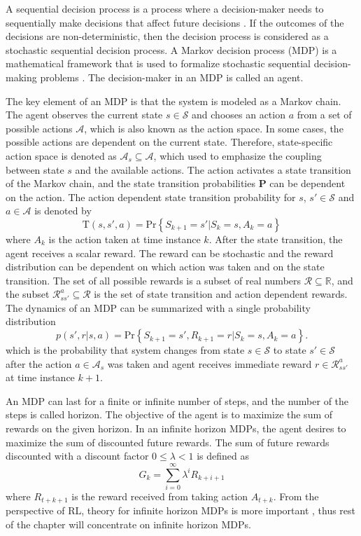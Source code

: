 \documentclass[english, 12pt, a4paper, elec, utf8, a-1b, online]{aaltothesis}
\renewcommand{\vec}[1]{\mathbf{#1}}
\newcommand{\Ss}{\mathcal{S}}
\newcommand{\As}{\mathcal{A}}
\newcommand{\Rs}{\mathcal{R}}
\renewcommand{\Pr}[1]{\text{Pr}\left\{ #1 \right\}}
\newcommand{\stprobs}{\vec{P}}
\newcommand{\real}{\mathbb{R}}
\begin{document}
A sequential decision process is a process where a decision-maker needs to sequentially make decisions that affect future decisions \cite{LaValle2006}.
If the outcomes of the decisions are non-deterministic, then the decision process is considered as a stochastic sequential decision process.
A Markov decision process (MDP) is a mathematical framework that is used to formalize stochastic sequential decision-making problems \cite{Sutton2018}.
The decision-maker in an MDP is called an agent.

The key element of an MDP is that the system is modeled as a Markov chain.
The agent observes the current state $s \in \Ss$ and chooses an action $a$ from a set of possible actions $\As$, which is also known as the action space.
In some cases, the possible actions are dependent on the current state.
Therefore, state-specific action space is denoted as $\As_s \subseteq \As$, which used to emphasize the coupling between state $s$ and the available actions. 
The action activates a state transition of the Markov chain, and the state transition probabilities $\stprobs$ can be dependent on the action.
The action dependent state transition probability for $s$, $s' \in \Ss$ and $a \in \As$ is denoted by 
\begin{equation}\label{eq:mdp_st_prob}
    \mathrm{T}(s, s', a) = \Pr{S_{k+1}=s' | S_{k}=s , A_k=a}
\end{equation}
where $A_k$ is the action taken at time instance $k$.  
After the state transition, the agent receives a scalar reward.
The reward can be stochastic and the reward distribution can be dependent on which action was taken and on the state transition.
The set of all possible rewards is a subset of real numbers $\Rs \subseteq \real$, and the subset $\Rs_{ss'}^a \subseteq \Rs$ is the set of state transition and action dependent rewards.
The dynamics of an MDP can be summarized with a single probability distribution
\begin{equation}\label{eq:MDP_probs}
    p(s', r | s, a) = \Pr{ S_{k+1}=s', R_{k+1}=r | S_k=s, A_k=a }.
\end{equation}
which is the probability that system changes from state $s \in \Ss$ to state $s' \in \Ss$ after the action $a \in \As_s$ was taken and agent receives immediate reward $r \in \Rs_{ss'}^a$ at time instance $k+1$.

An MDP can last for a finite or infinite number of steps, and the number of the steps is called horizon.
The objective of the agent is to maximize the sum of rewards on the given horizon.
In an infinite horizon MDPs, the agent desires to maximize the sum of discounted future rewards.
The sum of future rewards discounted with a discount factor $0 \leq \lambda < 1$ is defined as
\begin{equation}\label{eq:discounted_sum}
    G_k = \sum_{i=0}^{\infty} \lambda^i R_{k + i + 1}
\end{equation}
where $R_{t+k+1}$ is the reward received from taking action $A_{t+k}$. 
From the perspective of RL, theory for infinite horizon MDPs is more important \cite{Sutton2018}, thus rest of the chapter will concentrate on infinite horizon MDPs.
\end{document}
